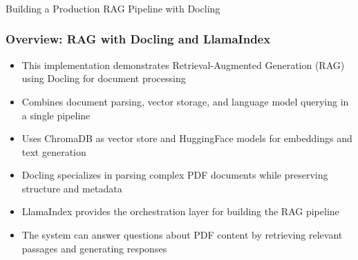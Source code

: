 \begin{frame}[fragile]\frametitle{}
\begin{center}
{\Large Building a Production RAG Pipeline with Docling}

\end{center}
\end{frame}

\begin{frame}[fragile]\frametitle{Overview: RAG with Docling and LlamaIndex}
      \begin{itemize}
          \item This implementation demonstrates Retrieval-Augmented Generation (RAG) using Docling for document processing
          \item Combines document parsing, vector storage, and language model querying in a single pipeline
          \item Uses ChromaDB as vector store and HuggingFace models for embeddings and text generation
          \item Docling specializes in parsing complex PDF documents while preserving structure and metadata
          \item LlamaIndex provides the orchestration layer for building the RAG pipeline
          \item The system can answer questions about PDF content by retrieving relevant passages and generating responses
      \end{itemize}
\end{frame}

